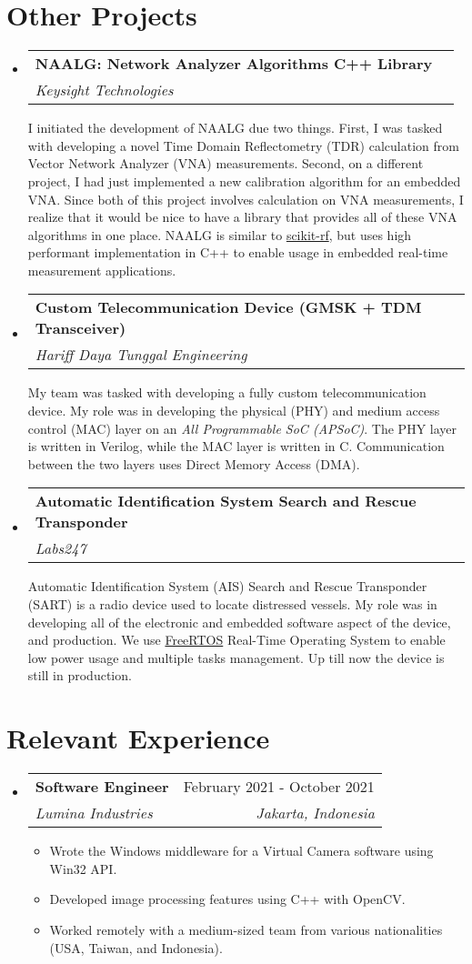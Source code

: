 \documentclass[letterpaper,11pt]{article}
\makeatletter
\newcommand{\resumeItem}[1]{
  \item\small{
    {#1 \vspace{-2pt}}
  }
}
\newcommand{\resumeSubheading}[4]{
  \vspace{-2pt}\item
    \begin{tabular*}{0.97\textwidth}[t]{l@{\extracolsep{\fill}}r}
      \textbf{#1} & #2 \\
      \textit{\small#3} & \textit{\small #4} \\
    \end{tabular*}\vspace{-7pt}
}
\newcommand{\resumeProjectHeading}[3]{
  \item
  \begin{tabular*}{0.97\textwidth}{l@{\extracolsep{\fill}}r}
    \small\textbf{#1} & #2 \\
    \textit{\small#3} \\
  \end{tabular*}\vspace{-7pt}
}
\newcommand{\resumeSubHeadingListStart}{\begin{itemize}[leftmargin=0.15in, label={}]}
\newcommand{\resumeSubHeadingListEnd}{\end{itemize}}
\newcommand{\resumeItemListStart}{\begin{itemize}}
\newcommand{\resumeItemListEnd}{\end{itemize}\vspace{-5pt}}
\makeatother
\begin{document}
\section{Other Projects}
\resumeSubHeadingListStart
\resumeProjectHeading
  {NAALG: Network Analyzer Algorithms C++ Library}{}
  {Keysight Technologies}
\begin{justify}
  I initiated the development of NAALG due two things. First, I was tasked with
  developing a novel Time Domain Reflectometry (TDR) calculation from Vector
  Network Analyzer (VNA) measurements. Second, on a different project, I had
  just implemented a new calibration algorithm for an embedded VNA. Since both
  of this project involves calculation on VNA measurements, I realize that it
  would be nice to have a library that provides all of these VNA algorithms in
  one place. NAALG is similar to
  \href{https://scikit-rf.readthedocs.io}{scikit-rf}, but uses high performant
  implementation in C++ to enable usage in embedded real-time measurement
  applications.
\end{justify}
\resumeProjectHeading
  {Custom Telecommunication Device (GMSK + TDM Transceiver)}{}
  {Hariff Daya Tunggal Engineering}
\begin{justify}
  My team was tasked with developing a fully custom telecommunication device.
  My role was in developing the physical (PHY) and medium access control (MAC)
  layer on an \textit{All Programmable SoC (APSoC)}. The PHY layer is written
  in Verilog, while the MAC layer is written in C. Communication between the
  two layers uses Direct Memory Access (DMA).
\end{justify}
\resumeProjectHeading
  {Automatic Identification System Search and Rescue Transponder}{}
  {Labs247}
\begin{justify}
  Automatic Identification System (AIS) Search and Rescue Transponder (SART) is
  a radio device used to locate distressed vessels. My role was in developing
  all of the electronic and embedded software aspect of the device, and
  production. We use \href{https://freertos.org}{FreeRTOS} Real-Time Operating
  System to enable low power usage and multiple tasks management. Up till now
  the device is still in production.
\end{justify}
\resumeSubHeadingListEnd

\section{Relevant Experience}
\resumeSubHeadingListStart
\resumeSubheading
  {Software Engineer}{February 2021 - October 2021}
  {Lumina Industries}{Jakarta, Indonesia}
\resumeItemListStart
\resumeItem{Wrote the Windows middleware for a Virtual Camera software using
Win32 API.}
\resumeItem{Developed image processing features using C++ with OpenCV.}
\resumeItem{Worked remotely with a medium-sized team from various nationalities
(USA, Taiwan, and Indonesia).}
\resumeItemListEnd
\resumeSubHeadingListEnd
\end{document}
